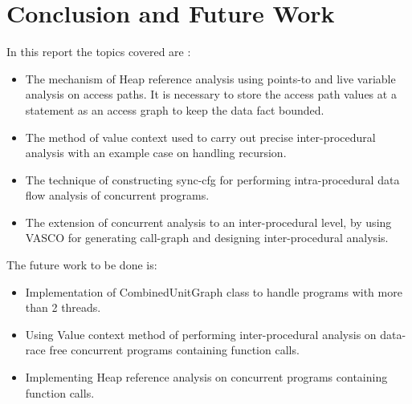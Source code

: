 \chapter{Conclusion and Future Work}

In this report the topics covered are : 

\begin{itemize}
	\item The mechanism of Heap reference analysis using points-to and live variable analysis on access paths. It is necessary to store the access path values at a statement as an access graph to keep the data fact bounded.
	\item The method of value context used to carry out precise inter-procedural analysis with an example case on handling recursion.
	\item The technique of constructing sync-cfg for performing intra-procedural data flow analysis of concurrent programs.
	\item The extension of concurrent analysis to an inter-procedural level, by using VASCO for generating call-graph and designing inter-procedural analysis.
\end{itemize}

The future work to be done is:

\begin{itemize}
	\item Implementation of CombinedUnitGraph class to handle programs with more than 2 threads.
	\item Using Value context method of performing inter-procedural analysis on data-race free concurrent programs containing function calls.
	\item Implementing Heap reference analysis on concurrent programs containing function calls.
\end{itemize}

